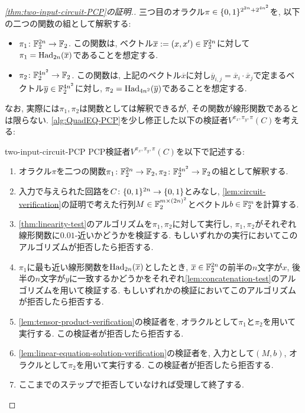 \begin{proof}[\cref{thm:two-input-circuit-PCP}の証明.]
三つ目のオラクル$\pi\in\{0,1\}^{2^{2n} + 2^{4n^2}}$を, 以下の二つの関数の組として解釈する:
\begin{itemize}
  \item $\pi_1 \colon \mathbb{F}_2^{2n} \to \mathbb{F}_2$. この関数は, ベクトル$\overline{x}:=(x,x')\in\mathbb{F}_2^{2n}$に対して$\pi_1 = \mathrm{Had}_{2n}(\overline{x})$であることを想定する.
  \item $\pi_2 \colon \mathbb{F}_2^{4n^2} \to \mathbb{F}_2$. この関数は, 上記のベクトル$\overline{x}$に対し$\overline{y}_{i,j} = \overline{x}_i\cdot \overline{x}_j$で定まるベクトル$\overline{y}\in\mathbb{F}_2^{4n^2}$に対し, $\pi_2 = \mathrm{Had}_{4n^2}(\overline{y})$であることを想定する.
\end{itemize}
なお, 実際には$\pi_1,\pi_2$は関数としては解釈できるが, その関数が線形関数であるとは限らない.
\cref{alg:QuadEQ-PCP}を少し修正した以下の検証者$V^{\pi_x,\pi_{y},\pi}(C)$を考える:

\begin{algo}{}{two-input-circuit-PCP}
  PCP検証者$V^{\pi_x,\pi_{y},\pi}(C)$を以下で記述する:
  \begin{enumerate}
    \item オラクル$\pi$を二つの関数$\pi_1\colon\mathbb{F}_2^{2n}\to\mathbb{F}_2,\pi_2\colon\mathbb{F}_2^{4n^2}\to\mathbb{F}_2$の組として解釈する.
    \item 入力で与えられた回路を$C\colon\{0,1\}^{2n}\to\{0,1\}$とみなし, \cref{lem:circuit-verification}の証明で考えた行列$M\in\mathbb{F}_2^{m\times {(2n)^2}}$とベクトル$b\in\mathbb{F}_2^m$を計算する.
    \item \cref{thm:linearity-test}のアルゴリズムを$\pi_1,\pi_2$に対して実行し, $\pi_1,\pi_2$がそれぞれ線形関数に$0.01$-近いかどうかを検証する. もしいずれかの実行においてこのアルゴリズムが拒否したら拒否する.
    \item $\pi_1$に最も近い線形関数を$\mathrm{Had}_{2n}(\overline{x})$としたとき, $\overline{x}\in\mathbb{F}_2^{2n}$の前半の$n$文字が$x$, 後半の$n$文字が$y$に一致するかどうかをそれぞれ\cref{lem:concatenation-test}のアルゴリズムを用いて検証する. もしいずれかの検証においてこのアルゴリズムが拒否したら拒否する.
    \item \cref{lem:tensor-product-verification}の検証者を, オラクルとして$\pi_1$と$\pi_2$を用いて実行する. この検証者が拒否したら拒否する.
    \item \cref{lem:linear-equation-solution-verification}の検証者を, 入力として$(M,b)$, オラクルとして$\pi_2$を用いて実行する. この検証者が拒否したら拒否する.
    \item ここまでのステップで拒否していなければ受理して終了する.
  \end{enumerate}
\end{algo}


\end{proof}
